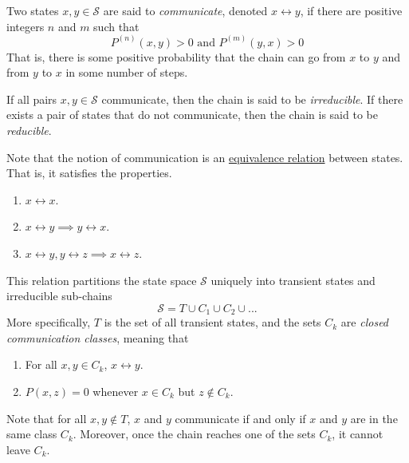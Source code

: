   \begin{definition}[Communication]
    \label{def:communication}
    Two states $x, y \in \mathcal{S}$ are said to \textit{communicate}, denoted $x \leftrightarrow y$, if there are positive integers $n$ and $m$ such that 
    \begin{equation}
      P^{(n)} (x, y) > 0 \text{ and } P^{(m)} (y, x) > 0
    \end{equation}
    That is, there is some positive probability that the chain can go from $x$ to $y$ and from $y$ to $x$ in some number of steps. 
  \end{definition}

  \begin{definition}
    \label{def:irreducible-chains}
    If all pairs $x, y \in \mathcal{S}$ communicate, then the chain is said to be \textit{irreducible}. If there exists a pair of states that do not communicate, then the chain is said to be \textit{reducible}. 
  \end{definition}

  Note that the notion of communication is an \hyperref[st-def:equivalence_relation]{equivalence relation} between states. That is, it satisfies the properties. 
  \begin{enumerate}
    \item $x \leftrightarrow x$.
    \item $x \leftrightarrow y \implies y \leftrightarrow x$.
    \item $x \leftrightarrow y, y \leftrightarrow z \implies x \leftrightarrow z$.
  \end{enumerate}
  This relation partitions the state space $\mathcal{S}$ uniquely into transient states and irreducible sub-chains
  \begin{equation}
    \mathcal{S} = T \cup C_1 \cup C_2 \cup ...
  \end{equation}
  More specifically, $T$ is the set of all transient states, and the sets $C_k$ are \textit{closed communication classes}, meaning that
  \begin{enumerate}
    \item For all $x, y \in C_k$, $x \leftrightarrow y$. 
    \item $P(x, z) = 0$ whenever $x \in C_k$ but $z \not\in C_k$. 
  \end{enumerate}
  Note that for all $x, y \not\in T$, $x$ and $y$ communicate if and only if $x$ and $y$ are in the same class $C_k$. Moreover, once the chain reaches one of the sets $C_k$, it cannot leave $C_k$. 

